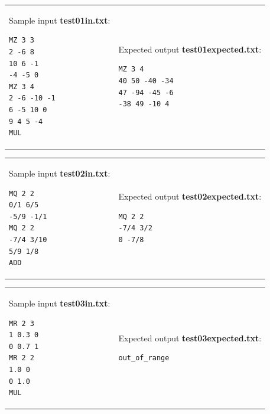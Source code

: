 \documentclass[11pt]{article}
\begin{document}
\vspace{10pt}
\begin{tabular}{@{}ll@{}}
\begin{minipage}[t]{0.49\columnwidth}
Sample input {\bf test01in.txt}:
\begin{verbatim}
MZ 3 3
2 -6 8
10 6 -1
-4 -5 0 
MZ 3 4
2 -6 -10 -1
6 -5 10 0
9 4 5 -4
MUL
\end{verbatim}
\end{minipage} 
&
\begin{minipage}[t]{0.49\columnwidth}
Expected output {\bf test01expected.txt}:
\begin{verbatim}
MZ 3 4
40 50 -40 -34
47 -94 -45 -6
-38 49 -10 4
\end{verbatim}
\end{minipage} 
\end{tabular}

\vspace{10pt}
\begin{tabular}{@{}ll@{}}
\begin{minipage}[t]{0.49\columnwidth}
Sample input {\bf test02in.txt}:
\begin{verbatim}
MQ 2 2
0/1 6/5
-5/9 -1/1
MQ 2 2
-7/4 3/10
5/9 1/8
ADD
\end{verbatim}
\end{minipage} 
&
\begin{minipage}[t]{0.49\columnwidth}
Expected output {\bf test02expected.txt}:
\begin{verbatim}
MQ 2 2
-7/4 3/2
0 -7/8
\end{verbatim}
\end{minipage} 
\end{tabular}

\vspace{10pt}
\begin{tabular}{@{}ll@{}}
\begin{minipage}[t]{0.49\columnwidth}
Sample input {\bf test03in.txt}:
\begin{verbatim}
MR 2 3
1 0.3 0
0 0.7 1
MR 2 2
1.0 0
0 1.0
MUL
\end{verbatim}
\end{minipage} 
&
\begin{minipage}[t]{0.49\columnwidth}
Expected output {\bf test03expected.txt}:
\begin{verbatim}
out_of_range
\end{verbatim}
\end{minipage} 
\end{tabular}
\end{document}
